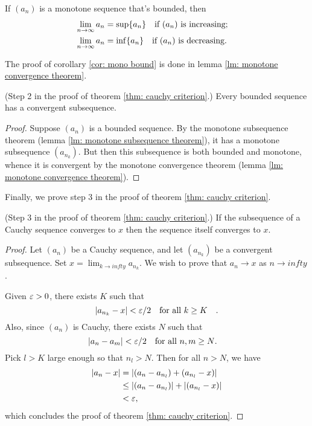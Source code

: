 \documentclass[10pt]{article}
\begin{document}
	\begin{corollary} \label{cor: mono bound}
		If $(a_n)$ is a monotone sequence that's bounded, then
		\begin{align}
			\lim_{n \to \infty} a_n &= \sup\{a_n\} \qq{if $(a_n)$ is increasing;} \\
			\lim_{n \to \infty} a_n &= \inf\{a_n\} \qq{if $(a_n)$ is decreasing.}
		\end{align}
	\end{corollary}
	The proof of corollary \ref{cor: mono bound} is done in lemma \ref{lm: monotone convergence theorem}.
	\begin{proposition}
		(Step 2 in the proof of theorem \ref{thm: cauchy criterion}.) Every bounded sequence has a convergent subsequence.
	\end{proposition}
	\begin{proof}
		Suppose $(a_n)$ is a bounded sequence. By the monotone subsequence theorem (lemma \ref{lm: monotone subsequence theorem}), it has a monotone subsequence $(a_{n_k})$. But then this subsequence is both bounded and monotone, whence it is convergent by the monotone convergence theorem (lemma \ref{lm: monotone convergence theorem}).
	\end{proof}
	Finally, we prove step 3 in the proof of theorem \ref{thm: cauchy criterion}.
	\begin{proposition}
		(Step 3 in the proof of theorem \ref{thm: cauchy criterion}.) If the subsequence of a Cauchy sequence converges to $x$ then the sequence itself converges to $x$.
	\end{proposition}
	\begin{proof}
		Let $(a_n)$ be a Cauchy sequence, and let $(a_{n_k})$ be a convergent subsequence. Set $x = \lim_{k \to infty} a_{n_k}$. We wish to prove that $a_n \to x$ as $n \to infty$.

		Given $\varepsilon > 0$, there exists $K$ such that
		\begin{equation}
			\abs{a_{n_k} - x} < \veps / 2 \qq{for all $k \ge K$}.
		\end{equation}
		Also, since $(a_n)$ is Cauchy, there exists $N$ such that
		\begin{equation}
			\abs{a_n - a_m} < \veps /2 \qq{for all $n,m \ge N$.}
		\end{equation}
		Pick $l > K$ large enough so that $n_l > N$. Then for all $n > N$, we have
		\begin{align*}
			\abs{a_n - x} &= \abs{(a_n - a_{n_l}) + (a_{n_l} - x)} \\
			&\le \abs{(a_n - a_{n_l})} + \abs{(a_{n_l} - x)} \\
			&< \varepsilon,
		\end{align*}
		which concludes the proof of theorem \ref{thm: cauchy criterion}.
	\end{proof}
\end{document}
